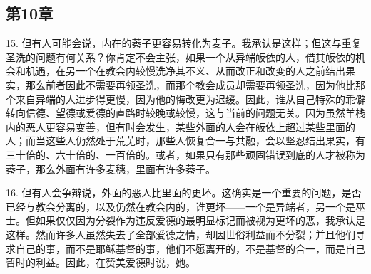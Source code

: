 
\subsection{第10章}

15. 但有人可能会说，内在的莠子更容易转化为麦子。我承认是这样；但这与重复圣洗的问题有何关系？你肯定不会主张，如果一个从异端皈依的人，借其皈依的机会和机遇，在另一个在教会内较慢洗净其不义、从而改正和改变的人之前结出果实，那么前者因此不需要再领圣洗，而那个教会成员却需要再领圣洗，因为他比那个来自异端的人进步得更慢，因为他的悔改更为迟缓。因此，谁从自己特殊的乖僻转向信德、望德或爱德的直路时较晚或较慢，这与当前的问题无关。因为虽然羊栈内的恶人更容易变善，但有时会发生，某些外面的人会在皈依上超过某些里面的人；而当这些人仍然处于荒芜时，那些人恢复合一与共融，会以坚忍结出果实，有三十倍的、六十倍的、一百倍的。或者，如果只有那些顽固错误到底的人才被称为莠子，那么外面有许多麦穗，里面有许多莠子。\par

16. 但有人会争辩说，外面的恶人比里面的更坏。这确实是一个重要的问题，是否已经与教会分离的，以及仍然在教会内的，谁更坏——一个是异端者，另一个是巫士。但如果仅仅因为分裂作为违反爱德的最明显标记而被视为更坏的恶，我承认是这样。然而许多人虽然失去了全部爱德之情，却因世俗利益而不分裂；并且他们寻求自己的事，而不是耶稣基督的事，他们不愿离开的，不是基督的合一，而是自己暂时的利益。因此，在赞美爱德时说，她。\par

